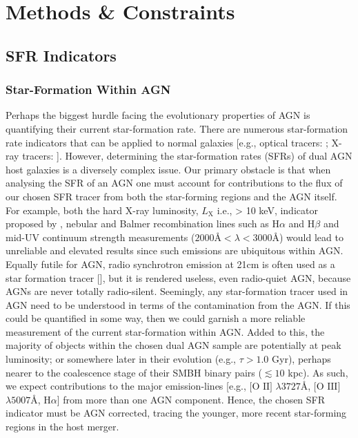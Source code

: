 \section{Methods \& Constraints}
\subsection{SFR Indicators}

\subsubsection{Star-Formation Within AGN}

Perhaps the biggest hurdle facing the evolutionary properties of AGN is quantifying their current star-formation rate. There are numerous star-formation rate indicators that can be applied to normal galaxies [e.g., optical tracers: \cite{Kennicutt_1998}; X-ray tracers: \cite{Gilfanov_2004}]. However, determining the star-formation rates (SFRs) of dual AGN host galaxies is a diversely complex issue. Our primary obstacle is that when analysing the SFR of an AGN one must account for contributions to the flux of our chosen SFR tracer from both the star-forming regions and the AGN itself. For example, both the hard X-ray luminosity, $L_{\text{X}}$ i.e., > 10 keV, indicator proposed by \cite{Gilfanov_2004}, nebular and Balmer recombination lines such as $\text{H}\alpha$ and $\text{H}\beta$ and mid-UV continuum strength measurements (${2000}Å<{\lambda}<3000Å$) would lead to unreliable and elevated results since such emissions are ubiquitous within AGN. Equally futile for AGN, radio synchrotron emission at 21cm is often used as a star formation tracer [\cite{1983A&A...120..219K}], but it is rendered useless, even radio-quiet AGN, because AGNs are never totally radio-silent. Seemingly, any star-formation tracer used in AGN need to be understood in terms of the contamination from the AGN. If this could be quantified in some way, then we could garnish a more reliable measurement of the current star-formation within AGN. Added to this, the majority of objects within the chosen dual AGN sample are potentially at peak luminosity; or somewhere later in their evolution (e.g., ${\tau}>{1.0}$ Gyr), perhaps nearer to the coalescence stage of their SMBH binary pairs ($\lesssim{10}$ kpc). As such, we expect contributions to the major emission-lines [e.g., $\text{[O II]}$ $\lambda{3727}Å$, $\text{[O III]}$ $\lambda{5007}Å$, $\text{H}\alpha$] from more than one AGN component. Hence, the chosen SFR indicator must be AGN corrected, tracing the younger, more recent star-forming regions in the host merger.

